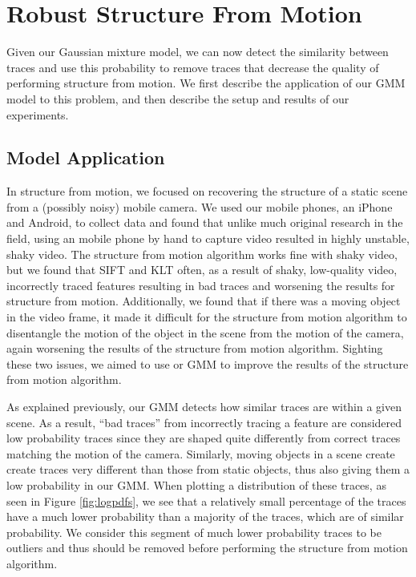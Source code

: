 \section{Robust Structure From Motion}

Given our Gaussian mixture model, we can now detect the similarity between
traces and use this probability to remove traces that decrease the quality of
performing structure from motion.  We first describe the application of our GMM
model to this problem, and then describe the setup and results of our
experiments.

\subsection{Model Application} %
\label{sub:Model Application}

In structure from motion, we focused on recovering the structure of a
static scene from a (possibly noisy) mobile camera.  We used our mobile phones,
an iPhone and Android, to collect data and found that unlike much original
research in the field, using an mobile phone by hand to capture video resulted
in highly unstable, shaky video.  The structure from motion algorithm works
fine with shaky video, but we found that SIFT and KLT often, as a result of
shaky, low-quality video, incorrectly traced features resulting in bad traces
and worsening the results for structure from motion.  Additionally, we found
that if there was a moving object in the video frame, it made it difficult for
the structure from motion algorithm to disentangle the motion of the object in
the scene from the motion of the camera, again worsening the results of the
structure from motion algorithm.  Sighting these two issues, we aimed to use or
GMM to improve the results of the structure from motion algorithm.

As explained previously, our GMM detects how similar traces are within a given
scene.  As a result, ``bad traces'' from incorrectly tracing a feature are
considered low probability traces since they are shaped quite differently from
correct traces matching the motion of the camera.  Similarly, moving objects in
a scene create create traces very different than those from static objects,
thus also giving them a low probability in our GMM.  When plotting a
distribution of these traces, as seen in Figure \ref{fig:logpdfs}, we see that
a relatively small percentage of the traces have a much lower probability than
a majority of the traces, which are of similar probability.  We consider this
segment of much lower probability traces to be outliers and thus should be
removed before performing the structure from motion algorithm.

